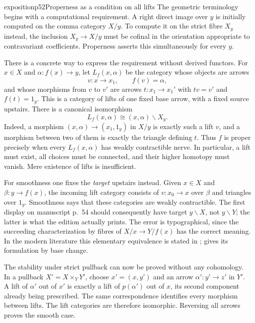 \begin{dcomment}{exposition}{p52}{Properness as a condition on all lifts}
The geometric terminology begins with a computational requirement. A right direct image over $y$ is initially computed on the comma category $X/y$. To compute it on the strict fibre $X_y$ instead, the inclusion $X_y\to X/y$ must be cofinal in the orientation appropriate to contravariant coefficients. Properness asserts this simultaneously for every $y$.

There is a concrete way to express the requirement without derived functors. For $x\in X$ and $\alpha:f(x)\to y$, let $L_f(x,\alpha)$ be the category whose objects are arrows
\[
 v:x\longrightarrow x_1,\qquad f(v)=\alpha,
\]
and whose morphisms from $v$ to $v'$ are arrows $t:x_1\to x_1'$ with $tv=v'$ and $f(t)=1_y$. This is a category of lifts of one fixed base arrow, with a fixed source upstairs. There is a canonical isomorphism
\[
 L_f(x,\alpha)\cong (x,\alpha)\backslash X_y.
\]
Indeed, a morphism $(x,\alpha)\to(x_1,1_y)$ in $X/y$ is exactly such a lift $v$, and a morphism between two of them is exactly the triangle defining $t$. Thus $f$ is proper precisely when every $L_f(x,\alpha)$ has weakly contractible nerve. In particular, a lift must exist, all choices must be connected, and their higher homotopy must vanish. Mere existence of lifts is insufficient.

For smoothness one fixes the \emph{target} upstairs instead. Given $x\in X$ and $\beta:y\to f(x)$, the incoming lift category consists of $v:x_0\to x$ over $\beta$ and triangles over $1_y$. Smoothness says that these categories are weakly contractible. The first display on manuscript p.~54 should consequently have target $y\backslash X$, not $y\backslash Y$; the latter is what the edition actually prints. The error is typographical, since the succeeding characterization by fibres of $X/x\to Y/f(x)$ has the correct meaning. In the modern literature this elementary equivalence is stated in \citet[Definition~3.2.1 and Proposition~3.2.3]{Maltsiniotis2020}; \citet[Theorem~1.2]{Maltsiniotis2005Asphericite} gives its formulation by base change.

The stability under strict pullback can now be proved without any cohomology. In a pullback $X'=X\times_Y Y'$, choose $x'=(x,y')$ and an arrow $\alpha':y'\to z'$ in $Y'$. A lift of $\alpha'$ out of $x'$ is exactly a lift of $p(\alpha')$ out of $x$, its second component already being prescribed. The same correspondence identifies every morphism between lifts. The lift categories are therefore isomorphic. Reversing all arrows proves the smooth case.


\end{dcomment}
